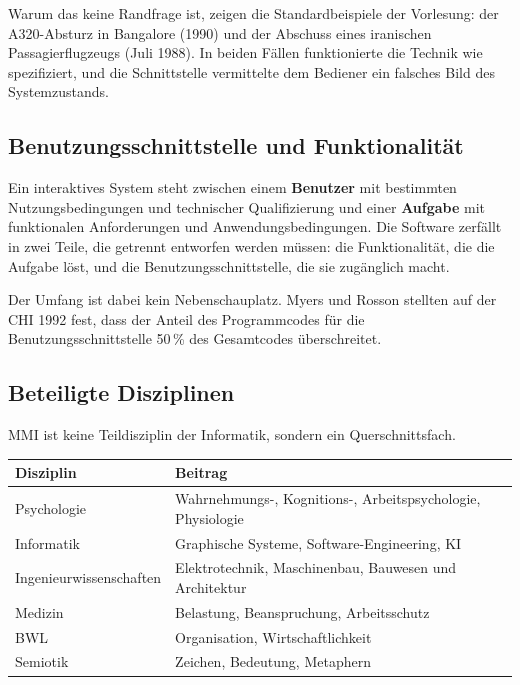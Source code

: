 \documentclass[12pt, a4paper]{article}
\begin{document}
\begin{notebox}
Warum das keine Randfrage ist, zeigen die Standardbeispiele der Vorlesung: der
A320-Absturz in Bangalore (1990) und der Abschuss eines iranischen Passagierflugzeugs
(Juli 1988). In beiden Fällen funktionierte die Technik wie spezifiziert, und die
Schnittstelle vermittelte dem Bediener ein falsches Bild des Systemzustands.
\end{notebox}

\subsection{Benutzungsschnittstelle und Funktionalität}

Ein interaktives System steht zwischen einem \textbf{Benutzer} mit bestimmten
Nutzungsbedingungen und technischer Qualifizierung und einer \textbf{Aufgabe} mit
funktionalen Anforderungen und Anwendungsbedingungen. Die Software zerfällt in zwei
Teile, die getrennt entworfen werden müssen: die Funktionalität, die die Aufgabe löst,
und die Benutzungsschnittstelle, die sie zugänglich macht.

Der Umfang ist dabei kein Nebenschauplatz. Myers und Rosson stellten auf der CHI 1992
fest, dass der Anteil des Programmcodes für die Benutzungsschnittstelle 50\,\% des
Gesamtcodes überschreitet.

\subsection{Beteiligte Disziplinen}

MMI ist keine Teildisziplin der Informatik, sondern ein Querschnittsfach.

\begin{center}
\begin{tabular}{@{}p{4cm}p{9cm}@{}}
\toprule
\textbf{Disziplin} & \textbf{Beitrag} \\
\midrule
Psychologie & Wahrnehmungs-, Kognitions-, Arbeitspsychologie, Physiologie \\
Informatik & Graphische Systeme, Software-Engineering, KI \\
Ingenieurwissenschaften & Elektrotechnik, Maschinenbau, Bauwesen und Architektur \\
Medizin & Belastung, Beanspruchung, Arbeitsschutz \\
BWL & Organisation, Wirtschaftlichkeit \\
Semiotik & Zeichen, Bedeutung, Metaphern \\
\bottomrule
\end{tabular}
\end{center}
\end{document}

